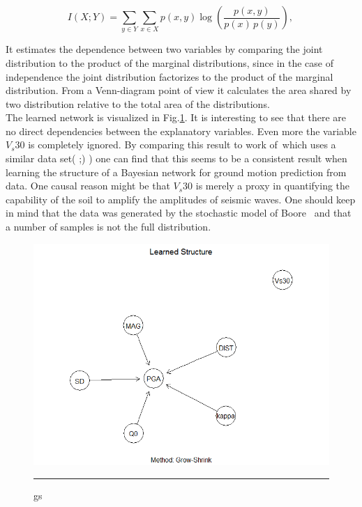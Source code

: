 \begin{equation}
I(X;Y) = \sum_{y \in Y} \sum_{x \in X} 
                 p(x,y) \log{ \left(\frac{p(x,y)}{p(x)\,p(y)}
                              \right) }, \,\! 
\label{eqn:mutual}
\end{equation}

 It estimates the dependence between two variables by comparing the joint distribution to the product of the marginal distributions, since in the case of independence the joint distribution factorizes to the product of the marginal distribution. From a Venn-diagram point of view it calculates the area shared by two distribution relative to the total area of the distributions.\\
The learned network is visualized in Fig.\ref{fig:gs}. It is interesting to see that there are no direct dependencies between the explanatory variables. Even more the variable $V_s30$ is completely ignored. By comparing this result to work of~\citep{Vogel2014}which uses a similar data set( ;) ) one can find that this seems to be a consistent result when learning the structure of a Bayesian network for ground motion prediction from data. One causal reason might be that $V_s30$ is merely a proxy in quantifying the capability of the soil to amplify the amplitudes of seismic waves. One should keep in mind that the data was generated by the stochastic model of Boore~\citep{boore2003} and that a number of samples is not the full distribution.\\
\begin{figure}[htbp]
	\centering
		\includegraphics[scale=0.5]{Figures/gs_one.png}
		\rule{35em}{0.5pt}
	\caption[Contraint-based Grow-Shrink Network]{gs}
	\label{fig:gs}
\end{figure}

